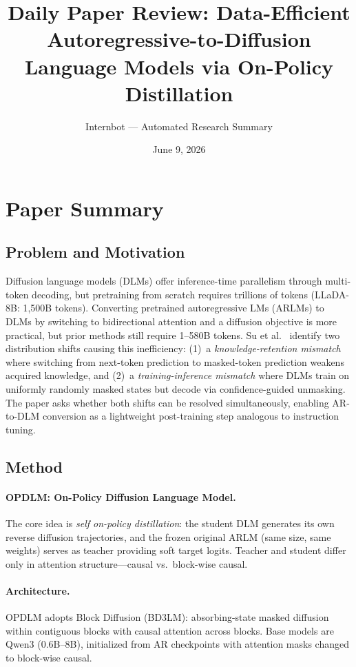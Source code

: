 \documentclass[11pt,a4paper]{article}
\title{Daily Paper Review: Data-Efficient Autoregressive-to-Diffusion\\Language Models via On-Policy Distillation}
\author{Internbot --- Automated Research Summary}
\date{June 9, 2026}
\begin{document}
\maketitle

\section{Paper Summary}

\subsection{Problem and Motivation}

Diffusion language models (DLMs) offer inference-time parallelism through multi-token decoding, but pretraining from scratch requires trillions of tokens (LLaDA-8B: 1,500B tokens). Converting pretrained autoregressive LMs (ARLMs) to DLMs by switching to bidirectional attention and a diffusion objective is more practical, but prior methods still require 1--580B tokens. Su et al.~\cite{su2026opdlm} identify two distribution shifts causing this inefficiency: (1)~a \emph{knowledge-retention mismatch} where switching from next-token prediction to masked-token prediction weakens acquired knowledge, and (2)~a \emph{training-inference mismatch} where DLMs train on uniformly randomly masked states but decode via confidence-guided unmasking. The paper asks whether both shifts can be resolved simultaneously, enabling AR-to-DLM conversion as a lightweight post-training step analogous to instruction tuning.

\subsection{Method}

\paragraph{OPDLM: On-Policy Diffusion Language Model.}
The core idea is \emph{self on-policy distillation}: the student DLM generates its own reverse diffusion trajectories, and the frozen original ARLM (same size, same weights) serves as teacher providing soft target logits. Teacher and student differ only in attention structure---causal vs.\ block-wise causal.

\paragraph{Architecture.} OPDLM adopts Block Diffusion (BD3LM): absorbing-state masked diffusion within contiguous blocks with causal attention across blocks. Base models are Qwen3 (0.6B--8B), initialized from AR checkpoints with attention masks changed to block-wise causal.
\end{document}

